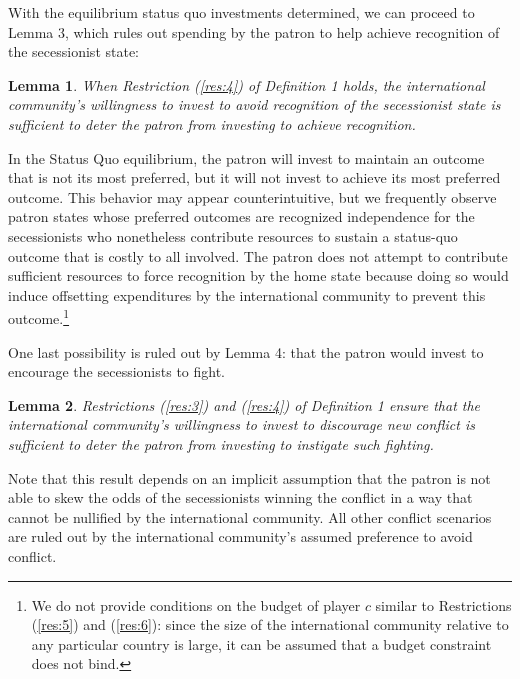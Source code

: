 \documentclass[11pt,letterpaper, notitlepage]{article}
\newtheorem{lemma}{Lemma}
\begin{document}
With the equilibrium status quo investments determined, we can proceed to Lemma 3, which rules out spending by the patron to help achieve recognition of the secessionist state:

\begin{lemma}
When Restriction (\ref{res:4}) of Definition 1 holds, the international community's willingness to invest to avoid recognition of the secessionist state is sufficient to deter the patron from investing to achieve recognition.
\end{lemma}

In the Status Quo equilibrium, the patron will invest to maintain an outcome that is not its most preferred, but it will not invest to achieve its most preferred outcome. This behavior may appear counterintuitive, but we frequently observe patron states whose preferred outcomes are recognized independence for the secessionists who  nonetheless contribute resources to sustain a status-quo outcome that is costly to all involved. The patron does not attempt to contribute sufficient resources to force recognition by the home state because doing so would induce offsetting expenditures by the international community to prevent this outcome.\footnote{We do not provide conditions on the budget of player $c$ similar to Restrictions (\ref{res:5}) and (\ref{res:6}): since the size of the international community relative to any particular country is large, it can be assumed that a budget constraint does not bind.}

One last possibility is ruled out by Lemma 4: that the patron would invest to encourage the secessionists to fight. 

\begin{lemma}
Restrictions (\ref{res:3}) and (\ref{res:4}) of Definition 1 ensure that the international community's willingness to invest to discourage new conflict is sufficient to deter the patron from investing to instigate such fighting.
\end{lemma}

Note that this result depends on an implicit assumption that the patron is not able to skew the odds of the secessionists winning the conflict in a way that cannot be nullified by the international community. All other conflict scenarios are ruled out by the international community's assumed preference to avoid conflict.
\end{document}
